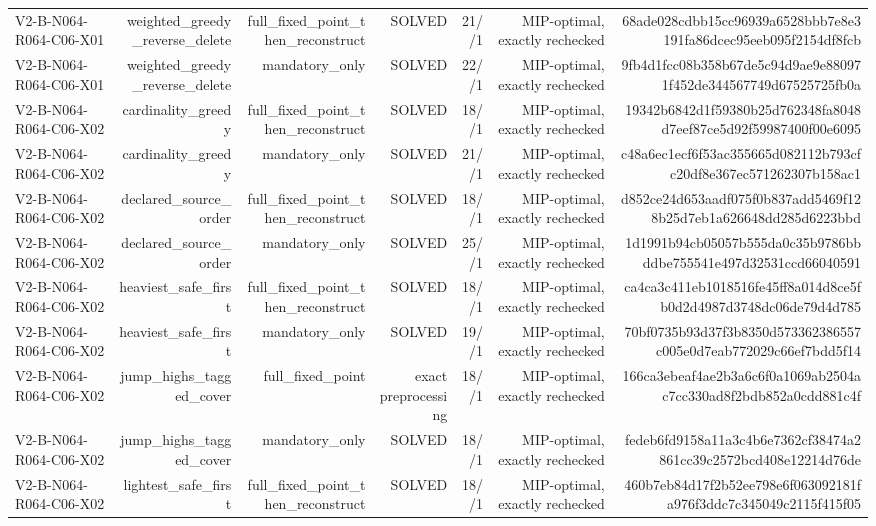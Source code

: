 {\begin{longtable}{lrrrrrr}
V2-B-N064-R064-C06-X01 & weighted\_greedy\_reverse\_delete & full\_fixed\_point\_then\_reconstruct & SOLVED & 21//1 & MIP-optimal, exactly rechecked & 68ade028cdbb15cc96939a6528bbb7e8e3191fa86dcec95eeb095f2154df8fcb \\
V2-B-N064-R064-C06-X01 & weighted\_greedy\_reverse\_delete & mandatory\_only & SOLVED & 22//1 & MIP-optimal, exactly rechecked & 9fb4d1fcc08b358b67de5c94d9ae9e880971f452de344567749d67525725fb0a \\
V2-B-N064-R064-C06-X02 & cardinality\_greedy & full\_fixed\_point\_then\_reconstruct & SOLVED & 18//1 & MIP-optimal, exactly rechecked & 19342b6842d1f59380b25d762348fa8048d7eef87ce5d92f59987400f00e6095 \\
V2-B-N064-R064-C06-X02 & cardinality\_greedy & mandatory\_only & SOLVED & 21//1 & MIP-optimal, exactly rechecked & c48a6ec1ecf6f53ac355665d082112b793cfc20df8e367ec571262307b158ac1 \\
V2-B-N064-R064-C06-X02 & declared\_source\_order & full\_fixed\_point\_then\_reconstruct & SOLVED & 18//1 & MIP-optimal, exactly rechecked & d852ce24d653aadf075f0b837add5469f128b25d7eb1a626648dd285d6223bbd \\
V2-B-N064-R064-C06-X02 & declared\_source\_order & mandatory\_only & SOLVED & 25//1 & MIP-optimal, exactly rechecked & 1d1991b94cb05057b555da0c35b9786bbddbe755541e497d32531ccd66040591 \\
V2-B-N064-R064-C06-X02 & heaviest\_safe\_first & full\_fixed\_point\_then\_reconstruct & SOLVED & 18//1 & MIP-optimal, exactly rechecked & ca4ca3c411eb1018516fe45ff8a014d8ce5fb0d2d4987d3748dc06de79d4d785 \\
V2-B-N064-R064-C06-X02 & heaviest\_safe\_first & mandatory\_only & SOLVED & 19//1 & MIP-optimal, exactly rechecked & 70bf0735b93d37f3b8350d573362386557c005e0d7eab772029c66ef7bdd5f14 \\
V2-B-N064-R064-C06-X02 & jump\_highs\_tagged\_cover & full\_fixed\_point & exact preprocessing & 18//1 & MIP-optimal, exactly rechecked & 166ca3ebeaf4ae2b3a6c6f0a1069ab2504ac7cc330ad8f2bdb852a0cdd881c4f \\
V2-B-N064-R064-C06-X02 & jump\_highs\_tagged\_cover & mandatory\_only & SOLVED & 18//1 & MIP-optimal, exactly rechecked & fedeb6fd9158a11a3c4b6e7362cf38474a2861cc39c2572bcd408e12214d76de \\
V2-B-N064-R064-C06-X02 & lightest\_safe\_first & full\_fixed\_point\_then\_reconstruct & SOLVED & 18//1 & MIP-optimal, exactly rechecked & 460b7eb84d17f2b52ee798e6f063092181fa976f3ddc7c345049c2115f415f05 \\

\end{longtable}}
